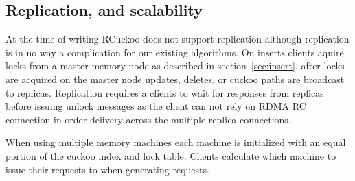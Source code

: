 \subsection{Replication, and scalability} 

 At the time of
writing RCuckoo does not support replication although
replication is in no way a complication for our existing
algorithms. On inserts clients aquire locks from a master
memory node as described in section~\ref{sec:insert}, after
locks are acquired on the master node updates, deletes, or
cuckoo paths are broadcast to replicas. Replication requires
a clients to wait for responses from replicas before issuing
unlock messages as the client can not rely on RDMA RC
connection in order delivery across the multiple replica
connections.

 When using
multiple memory machines each machine is initialized with an
equal portion of the cuckoo index and lock table. Clients
calculate which machine to issue their requests to when
generating requests.

